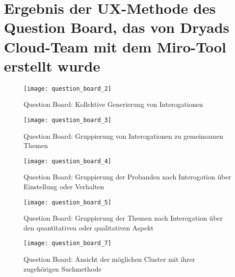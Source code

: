 \section{Ergebnis der UX-Methode des Question Board, das von Dryads Cloud-Team mit dem Miro-Tool erstellt wurde} \label{appendix:question_board}

\begin{figure}[H]
  \centering
  \texttt{[image: question\_board\_2]}
  \caption{Question Board: Kollektive Generierung von Interogationen}
  \label{fig:question_board_2}
\end{figure}
\begin{figure}[H]
  \centering
  \texttt{[image: question\_board\_3]}
  \caption{Question Board: Gruppierung von Interogationen zu gemeinsamen Themen}
  \label{fig:question_board_3}
\end{figure}
\begin{figure}[H]
  \centering
  \texttt{[image: question\_board\_4]}
  \caption{Question Board: Gruppierung der Probanden nach Interogation über Einstellung oder Verhalten}
  \label{fig:question_board_4}
\end{figure}
\begin{figure}[H]
  \centering
  \texttt{[image: question\_board\_5]}
  \caption{Question Board: Gruppierung der Themen nach Interogation über den quantitativen oder qualitativen Aspekt}
  \label{fig:question_board_5}
\end{figure}
\begin{figure}[H]
  \centering
  \texttt{[image: question\_board\_7]}
  \caption{Question Board: Ansicht der möglichen Cluster mit ihrer zugehörigen Suchmethode}
  \label{fig:question_board_7}
\end{figure}